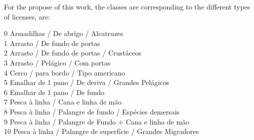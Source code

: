 For the propose of this work, the classes are corresponding to the different types of licenses, are: 

0 Armadilhas / De abrigo / Alcatruzes \\
1 Arrasto / De fundo de portas \\
2 Arrasto / De fundo de portas / Crustáceos\\
3 Arrasto / Pelágico / Com portas\\
4 Cerco / para bordo / Tipo americano\\
5 Emalhar de 1 pano / De deriva / Grandes Pelágicos\\
6 Emalhar de 1 pano / De fundo\\
7 Pesca à linha / Cana e linha de mão\\
8 Pesca à linha / Palangre de fundo / Espécies demersais\\
9 Pesca à linha / Palangre de Fundo + Cana e linha de mão\\
10 Pesca à linha / Palangre de superfície / Grandes Migradores




